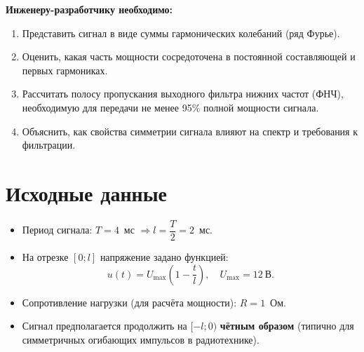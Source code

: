 \documentclass[a4paper,12pt]{article}
\begin{document}
\medskip
\noindent\textbf{Инженеру-разработчику необходимо:}
\begin{enumerate}[label=\arabic*.]
    \item Представить сигнал в виде суммы гармонических колебаний (ряд Фурье).
    \item Оценить, какая часть мощности сосредоточена в постоянной составляющей и первых гармониках.
    \item Рассчитать полосу пропускания выходного фильтра нижних частот (ФНЧ), необходимую для передачи не менее 95\% полной мощности сигнала.
    \item Объяснить, как свойства симметрии сигнала влияют на спектр и требования к фильтрации.
\end{enumerate}

\section{Исходные данные}
\begin{itemize}[label=$\bullet$]
    \item Период сигнала: $T = 4$~мс $\Rightarrow l = \dfrac{T}{2} = 2$~мс.
    \item На отрезке $[0; l]$ напряжение задано функцией:
    \[
    u(t) = U_{\max} \left(1 - \frac{t}{l}\right), \quad U_{\max} = 12~\text{В}.
    \]
    \item Сопротивление нагрузки (для расчёта мощности): $R = 1$~Ом.
    \item Сигнал предполагается продолжить на $[-l; 0)$ \textbf{чётным образом} (типично для симметричных огибающих импульсов в радиотехнике).
\end{itemize}
\end{document}
